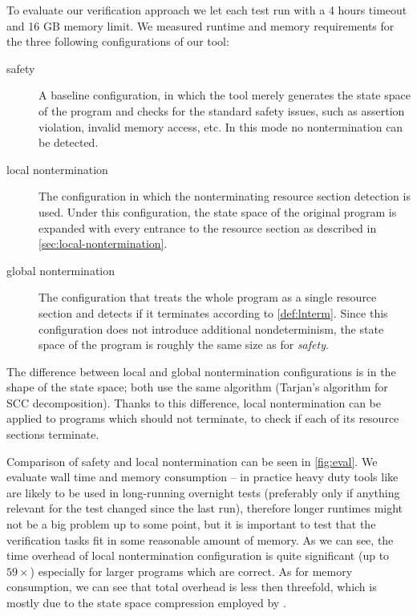 To evaluate our verification approach we let each test run with a 4 hours
timeout and 16 GB memory limit. We measured runtime and memory requirements for
the three following configurations of our tool:
\begin{description}
\item[safety] A baseline configuration, in which the tool merely generates the
  state space of the program and checks for the standard safety issues, such as
  assertion violation, invalid memory access, etc. In this mode no
  nontermination can be detected.
    \item[local nontermination] The configuration in which the nonterminating
      resource section detection is used. Under this configuration, the state
      space of the original program is expanded with every entrance to the
      resource section as described in \autoref{sec:local-nontermination}.
    \item[global nontermination] The configuration that treats the whole program
      as a single resource section and detects if it terminates according to
      \autoref{def:lnterm}. Since this configuration does not introduce
      additional nondeterminism, the state space of the program is roughly the
      same size as for \emph{safety}.
\end{description}
The difference between local and global nontermination configurations is
in the shape of the state space; both use the same algorithm (Tarjan's
algorithm for SCC decomposition). Thanks to this difference, local nontermination
can be applied to programs which should not terminate, to check if each of its
resource sections terminate.

Comparison of safety and local nontermination can be seen in \autoref{fig:eval}.  We
evaluate wall time and memory consumption -- in practice heavy duty tools like
\divine are likely to be used in long-running overnight tests (preferably only
if anything relevant for the test changed since the last run), therefore longer
runtimes might not be a big problem up to some point, but it is important to
test that the verification tasks fit in some reasonable amount of memory.  As we
can see, the time overhead of local nontermination configuration is quite
significant (up to $59 \times$) especially for larger programs which are
correct. As for memory consumption, we can see that total overhead is less then
threefold, which is mostly due to the state space compression employed by
\divine.

